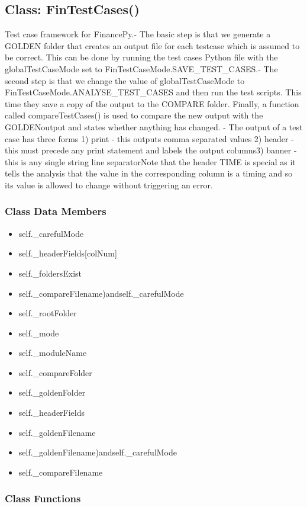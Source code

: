 \documentclass[twoside,11pt]{book}
\begin{document}
\subsection{Class: FinTestCases()}
Test case framework for FinancePy.- The basic step is that we generate a GOLDEN folder that creates an output file for each testcase which is assumed to be correct. This can be done by running the test cases Python file with the globalTestCaseMode set to FinTestCaseMode.SAVE\_TEST\_CASES.- The second step is that we change the value of globalTestCaseMode to FinTestCaseMode.ANALYSE\_TEST\_CASES and then run the test scripts. This time they save a copy of the output to the COMPARE folder. Finally, a function called compareTestCases() is used to compare the new output with the GOLDENoutput and states whether anything has changed. - The output of a test case has three forms 1) print - this outputs comma separated values 2) header - this must precede any print statement and labels the output columns3) banner - this is any single string line separatorNote that the header TIME is special as it tells the analysis that the value in the corresponding column is a timing and so its value is allowed to change without triggering an error. 

\subsubsection{Class Data Members}
\begin{itemize}
\item{self.\_carefulMode}
\item{self.\_headerFields[colNum]}
\item{self.\_foldersExist}
\item{self.\_compareFilename)andself.\_carefulMode}
\item{self.\_rootFolder}
\item{self.\_mode}
\item{self.\_moduleName}
\item{self.\_compareFolder}
\item{self.\_goldenFolder}
\item{self.\_headerFields}
\item{self.\_goldenFilename}
\item{self.\_goldenFilename)andself.\_carefulMode}
\item{self.\_compareFilename}
\end{itemize}

\subsubsection{Class Functions}
\end{document}
